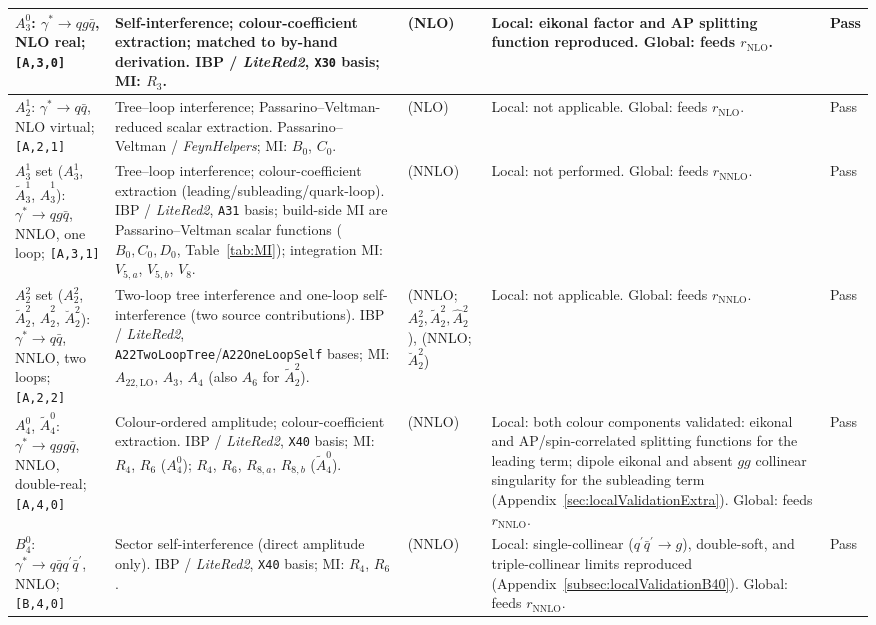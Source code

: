 {\begin{center}
\begin{longtable}{|>{\raggedright\arraybackslash}p{2.5cm}|>{\raggedright\arraybackslash}p{4.0cm}|>{\raggedright\arraybackslash}p{1.9cm}|>{\raggedright\arraybackslash}p{3.2cm}|>{\raggedright\arraybackslash}p{1.9cm}|}
$A_3^0$: $\gamma^*\to qg\bar q$, NLO real; \texttt{[A,3,0]} & Self-interference; colour-coefficient extraction; matched to by-hand derivation. IBP / \textit{LiteRed2}, \texttt{X30} basis; MI: $R_3$. & \cite{Gehrmann-DeRidder:2005btv} (NLO) & Local: eikonal factor and AP splitting function reproduced. Global: feeds $r_\text{NLO}$. & Pass \\ \hline
$A_2^1$: $\gamma^*\to q\bar q$, NLO virtual; \texttt{[A,2,1]} & Tree--loop interference; Passarino--Veltman-reduced scalar extraction. Passarino--Veltman / \textit{FeynHelpers}; MI: $B_0$, $C_0$. & \cite{Gehrmann-DeRidder:2005btv} (NLO) & Local: not applicable. Global: feeds $r_\text{NLO}$. & Pass \\ \hline
$A_3^1$ set ($A_3^1$, $\tilde A_3^1$, $\hat A_3^1$): $\gamma^*\to qg\bar q$, NNLO, one loop; \texttt{[A,3,1]} & Tree--loop interference; colour-coefficient extraction (leading/subleading/quark-loop). IBP / \textit{LiteRed2}, \texttt{A31} basis; build-side MI are Passarino--Veltman scalar functions ($B_0,C_0,D_0$, Table~\ref{tab:MI}); integration MI: $V_{5,a}$, $V_{5,b}$, $V_8$. & \cite{Gehrmann-DeRidder:2005btv,Gehrmann-DeRidder:2004ttg} (NNLO) & Local: not performed. Global: feeds $r_\text{NNLO}$. & Pass \\ \hline
$A_2^2$ set ($A_2^2$, $\tilde A_2^2$, $\hat A_2^2$, $\breve A_2^2$): $\gamma^*\to q\bar q$, NNLO, two loops; \texttt{[A,2,2]} & Two-loop tree interference and one-loop self-interference (two source contributions). IBP / \textit{LiteRed2}, \texttt{A22TwoLoopTree}/\allowbreak\texttt{A22OneLoopSelf} bases; MI: $A_{22,\text{LO}}$, $A_3$, $A_4$ (also $A_6$ for $\tilde A_2^2$). & \cite{Gehrmann-DeRidder:2004ttg} (NNLO; $A_2^2,\tilde A_2^2,\hat A_2^2$), \cite{Jakubcik:2022zdi} (NNLO; $\breve A_2^2$) & Local: not applicable. Global: feeds $r_\text{NNLO}$. & Pass \\ \hline
$A_4^0$, $\tilde A_4^0$: $\gamma^*\to qgg\bar q$, NNLO, double-real; \texttt{[A,4,0]} & Colour-ordered amplitude; colour-coefficient extraction. IBP / \textit{LiteRed2}, \texttt{X40} basis; MI: $R_4$, $R_6$ ($A_4^0$); $R_4$, $R_6$, $R_{8,a}$, $R_{8,b}$ ($\tilde A_4^0$). & \cite{Gehrmann-DeRidder:2005btv} (NNLO) & Local: both colour components validated: eikonal and AP/spin-correlated splitting functions for the leading term; dipole eikonal and absent $gg$ collinear singularity for the subleading term (Appendix~\ref{sec:localValidationExtra}). Global: feeds $r_\text{NNLO}$. & Pass \\ \hline
$B_4^0$: $\gamma^*\to q\bar q q^\prime\bar q^\prime$, NNLO; \texttt{[B,4,0]} & Sector self-interference (direct amplitude only). IBP / \textit{LiteRed2}, \texttt{X40} basis; MI: $R_4$, $R_6$. & \cite{Gehrmann-DeRidder:2005btv} (NNLO) & Local: single-collinear ($q^\prime\bar q^\prime\to g$), double-soft, and triple-collinear limits reproduced (Appendix~\ref{subsec:localValidationB40}). Global: feeds $r_\text{NNLO}$. & Pass \\ \hline

\end{longtable}
\end{center}}
